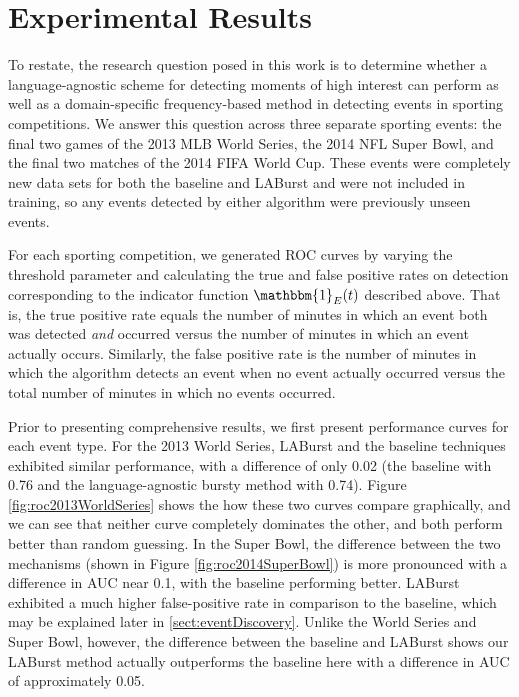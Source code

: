 \documentclass{sig-alternate}
\begin{document}
\section{Experimental Results}
\label{sect:results}

To restate, the research question posed in this work is to determine whether a language-agnostic scheme for detecting moments of high interest can perform as well as a domain-specific frequency-based method in detecting events in sporting competitions.
We answer this question across three separate sporting events: the final two games of the 2013 MLB World Series, the 2014 NFL Super Bowl, and the final two matches of the 2014 FIFA World Cup.
These events were completely new data sets for both the baseline and LABurst and were not included in training, so any events detected by either algorithm were previously unseen events.

For each sporting competition, we generated ROC curves by varying the threshold parameter and calculating the true and false positive rates on detection corresponding to the indicator function $\mathbbm{1}_E(t)$ described above.
That is, the true positive rate equals the number of minutes in which an event both was detected \emph{and} occurred versus the number of minutes in which an event actually occurs.
Similarly, the false positive rate is the number of minutes in which the algorithm detects an event when no event actually occurred versus the total number of minutes in which no events occurred.

Prior to presenting comprehensive results, we first present performance curves for each event type.
For the 2013 World Series, LABurst and the baseline techniques exhibited similar performance, with a difference of only 0.02 (the baseline with 0.76 and the language-agnostic bursty method with 0.74).
Figure \ref{fig:roc2013WorldSeries} shows the how these two curves compare graphically, and we can see that neither curve completely dominates the other, and both perform better than random guessing.
In the Super Bowl, the difference between the two mechanisms (shown in Figure \ref{fig:roc2014SuperBowl}) is more pronounced with a difference in AUC near 0.1, with the baseline performing better.
LABurst exhibited a much higher false-positive rate in comparison to the baseline, which may be explained later in \ref{sect:eventDiscovery}.
Unlike the World Series and Super Bowl, however, the difference between the baseline and LABurst shows our LABurst method actually outperforms the baseline here with a difference in AUC of approximately 0.05.
\end{document}
